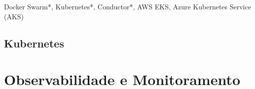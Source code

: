 Docker Swarm*, Kubernetes*, Conductor*, AWS EKS, Azure Kubernetes Service (AKS)

\subsection{Kubernetes}










\section{Observabilidade e Monitoramento}

